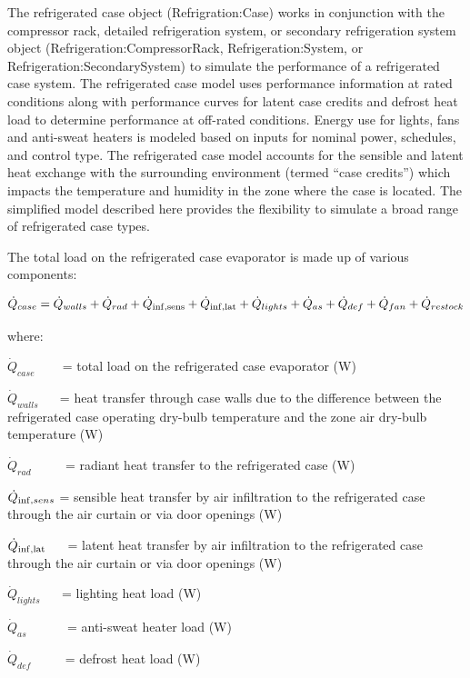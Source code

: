 The refrigerated case object (Refrigration:Case) works in conjunction with the compressor rack, detailed refrigeration system, or secondary refrigeration system object (Refrigeration:CompressorRack, Refrigeration:System, or Refrigeration:SecondarySystem) to simulate the performance of a refrigerated case system. The refrigerated case model uses performance information at rated conditions along with performance curves for latent case credits and defrost heat load to determine performance at off-rated conditions. Energy use for lights, fans and anti-sweat heaters is modeled based on inputs for nominal power, schedules, and control type. The refrigerated case model accounts for the sensible and latent heat exchange with the surrounding environment (termed ``case credits'') which impacts the temperature and humidity in the zone where the case is located. The simplified model described here provides the flexibility to simulate a broad range of refrigerated case types.

The total load on the refrigerated case evaporator is made up of various components:

\begin{equation}
{\dot Q_{case}} = {\dot Q_{walls}} + {\dot Q_{rad}} + {\dot Q_{{\rm{inf,sens}}}} + {\dot Q_{{\rm{inf,lat}}}} + {\dot Q_{lights}} + {\dot Q_{as}} + {\dot Q_{def}} + {\dot Q_{fan}} + {\dot Q_{restock}}
\end{equation}

where:

\({\dot Q_{case}}\) ~~~ = total load on the refrigerated case evaporator (W)

\({\dot Q_{walls}}\) ~~ = heat transfer through case walls due to the difference between the refrigerated case operating dry-bulb temperature and the zone air dry-bulb temperature (W)

\({\dot Q_{rad}}\) ~~~~ = radiant heat transfer to the refrigerated case (W)

\({\dot Q_{{\rm{inf,}}sens}}\) = sensible heat transfer by air infiltration to the refrigerated case through the air curtain or via door openings (W)

\({\dot Q_{{\rm{inf,lat}}}}\) ~~ = latent heat transfer by air infiltration to the refrigerated case through the air curtain or via door openings (W)

\({\dot Q_{lights}}\) ~~ = lighting heat load (W)

\({\dot Q_{as}}\) ~~~~~ = anti-sweat heater load (W)

\({\dot Q_{def}}\) ~~~~ = defrost heat load (W)

